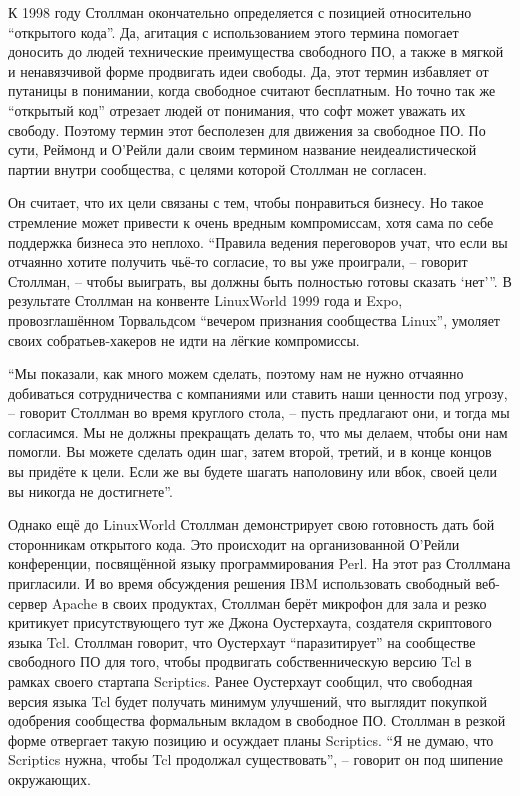 К 1998 году Столлман окончательно определяется с позицией относительно ``открытого кода''. Да, агитация с использованием этого термина помогает доносить до людей технические преимущества свободного ПО, а также в мягкой и ненавязчивой форме продвигать идеи свободы. Да, этот термин избавляет от путаницы в понимании, когда свободное считают бесплатным. Но точно так же ``открытый код'' отрезает людей от понимания, что софт может уважать их свободу. Поэтому термин этот бесполезен для движения за свободное ПО. По сути, Реймонд и О'Рейли дали своим термином название неидеалистической партии внутри сообщества, с целями которой Столлман не согласен.

Он считает, что их цели связаны с тем, чтобы понравиться бизнесу. Но такое стремление может привести к очень вредным компромиссам, хотя сама по себе поддержка бизнеса это неплохо. ``Правила ведения переговоров учат, что если вы отчаянно хотите получить чьё-то согласие, то вы уже проиграли, -- говорит Столлман, -- чтобы выиграть, вы должны быть полностью готовы сказать `нет'''. В результате Столлман на конвенте  LinuxWorld 1999 года и Expo, провозглашённом Торвальдсом ``вечером признания сообщества Linux'', умоляет своих собратьев-хакеров не идти на лёгкие компромиссы.

``Мы показали, как много можем сделать, поэтому нам не нужно отчаянно добиваться сотрудничества с компаниями или ставить наши ценности под угрозу, -- говорит Столлман во время круглого стола, -- пусть предлагают они, и тогда мы согласимся. Мы не должны прекращать делать то, что мы делаем, чтобы они нам помогли. Вы можете сделать один шаг, затем второй, третий, и в конце концов вы придёте к цели. Если же вы будете шагать наполовину или вбок, своей цели вы никогда не достигнете''.

Однако ещё до LinuxWorld Столлман демонстрирует свою готовность дать бой сторонникам открытого кода. Это происходит на организованной О'Рейли конференции, посвящённой языку программирования Perl. На этот раз Столлмана пригласили. И во время обсуждения решения IBM использовать свободный веб-сервер Apache в своих продуктах, Столлман берёт микрофон для зала и резко критикует присутствующего тут же Джона Оустерхаута, создателя скриптового языка Tcl. Столлман говорит, что Оустерхаут ``паразитирует'' на сообществе свободного ПО для того, чтобы продвигать собственническую версию Tcl в рамках своего стартапа Scriptics. Ранее Оустерхаут сообщил, что свободная версия языка Tcl будет получать минимум улучшений, что выглядит покупкой одобрения сообщества формальным вкладом в свободное ПО. Столлман в резкой форме отвергает такую позицию и осуждает планы Scriptics. ``Я не думаю, что Scriptics нужна, чтобы Tcl продолжал существовать'', -- говорит он под шипение окружающих.

